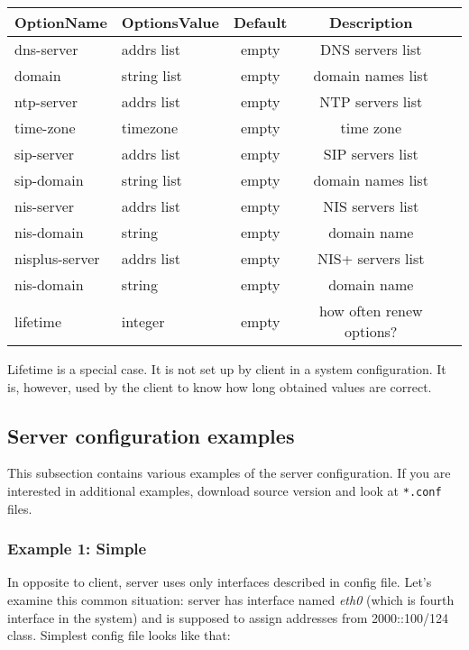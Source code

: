 \begin{center}
\begin{tabular}{|l|l|c|c|l|}
\hline
OptionName       & OptionsValue& Default    & Description \\ \hline
dns-server       & addrs list  & empty      & DNS servers list \\
domain           & string list & empty      & domain names list \\
ntp-server       & addrs list  & empty      & NTP servers list \\
time-zone        & timezone    & empty      & time zone \\
sip-server       & addrs list  & empty      & SIP servers list \\
sip-domain       & string list & empty      & domain names list \\

nis-server       & addrs list  & empty      & NIS servers list \\
nis-domain       & string      & empty      & domain name \\

nisplus-server   & addrs list  & empty      & NIS+ servers list \\
nis-domain       & string      & empty      & domain name \\
lifetime         & integer     & empty      & how often renew options? \\
\hline
\end{tabular}
\end{center}

Lifetime is a special case. It is not set up by client in a system
configuration. It is, however, used by the client to know how long
obtained values are correct.

\subsection{Server configuration examples}

This subsection contains various examples of the server
configuration. If you are interested in additional examples, download source version
and look at \verb+*.conf+ files.


\subsubsection{Example 1: Simple}

In opposite to client, server uses only interfaces described in config
file. Let's examine this common situation: server has interface
named \emph{eth0} (which is fourth interface in the system) and is
supposed to assign addresses from 2000::100/124 class. Simplest config
file looks like that:


